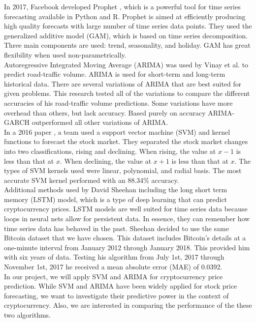 \documentclass[11pt,a4paper]{article}
\begin{document}
\quad In 2017, Facebook developed Prophet \cite{taylor}, which is a powerful tool for time series forecasting available in Python and R. Prophet is aimed at efficiently producing high quality forecasts with large number of time series data points. They used the generalized additive model (GAM), which is based on time series decomposition. Three main components are used: trend, seasonality, and holiday. GAM has great flexibility when used non-parametrically.\\

\quad Autoregressive Integrated Moving Average (ARIMA) was used by Vinay et al. \cite{vinay} to predict road-traffic volume. ARIMA is used for short-term and long-term historical data. There are several variations of ARIMA that are best suited for given problems. This research tested all of the variations to compare the different accuracies of his road-traffic volume predictions. Some variations have more overhead than others, but lack accuracy. Based purely on accuracy ARIMA-GARCH outperformed all other variations of ARIMA.\\

\quad In a 2016 paper \cite{ved}, a team used a support vector machine (SVM) and kernel functions to forecast the stock market. They separated the stock market changes into two classifications, rising and declining. When rising, the value at $x-1$ is less than that at $x$. When declining, the value at $x+1$ is less than that at $x$. The types of SVM kernels used were linear, polynomial, and radial basis. The most accurate SVM kernel performed with an 88.34\% accuracy.\\

\quad Additional methods used by David Sheehan \cite{sheehan} including the long short term memory (LSTM) model, which is a type of deep learning that can predict cryptocurrency prices. LSTM models are well suited for time series data because loops in neural nets allow for persistent data. In essence, they can remember how time series data has behaved in the past. Sheehan decided to use the same Bitcoin dataset that we have chosen. This dataset includes Bitcoin’s details at a one-minute interval from January 2012 through January 2018. This provided him with six years of data. Testing his algorithm from July 1st, 2017 through November 1st, 2017 he received a mean absolute error (MAE) of 0.0392. \\

\quad In our project, we will apply SVM and ARIMA for cryptocurrency price prediction. While SVM and ARIMA have been widely applied for stock price forecasting, we want to investigate their predictive power in the context of cryptocurrency. Also, we are interested in comparing the performance of the these two algorithms.
\end{document}
